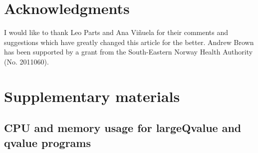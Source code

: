 \documentclass{amsart}
\newcommand{\beginsupplement}{%
        \setcounter{table}{0}
        \renewcommand{\thetable}{S\arabic{table}}%
        \setcounter{figure}{0}
        \renewcommand{\thefigure}{S\arabic{figure}}%
        \setcounter{section}{0}
        \renewcommand{\thesubsection}{S\arabic{subsection}}%

     }
\begin{document}
\section{Acknowledgments}

I would like to thank Leo Parts and Ana Vi\~{n}uela for their comments and suggestions which have greatly changed this article for the better. Andrew Brown has been supported by a grant from the South-Eastern Norway Health Authority (No. 2011060).

	

\beginsupplement

\section{Supplementary materials}

\subsection{CPU and memory usage for largeQvalue and qvalue programs}
\end{document}
